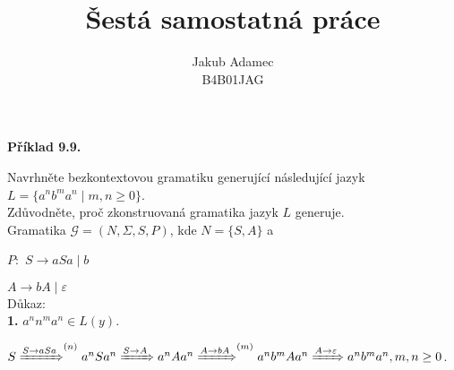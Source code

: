 \documentclass[11pt]{article}
\begin{document}

\newcommand\splitpage[2]{
      \begin{minipage}[t]{0.45\textwidth}#1
      \end{minipage}%
      \hfill
      \begin{minipage}[t]{0.45\textwidth}#2
      \end{minipage}
}
 
 
\title{\textbf{Šestá samostatná práce}}
\author{Jakub Adamec\\ %
B4B01JAG} %

\maketitle

\noindent
\textbf{Příklad 9.9.} 

Navrhněte bezkontextovou gramatiku generující následující jazyk ${L = \{a^n b^m a^n \mid m, n \geq 0\}}$.\\
Zdůvodněte, proč zkonstruovaná gramatika jazyk $L$ generuje.\\

\noindent
Gramatika $\mathcal{G}=(N, \Sigma, S, P)$, kde $N=\{S, A\}$ a

\noindent
$P: $
$S \rightarrow aSa \mid b$

$A \rightarrow bA \mid \varepsilon$\\


\noindent
Důkaz:
\\

\textbf{1.} $a^n n^m a^n \in L(y)$.

$S \xRightarrow{S \rightarrow a S a }^{(n)} a^n S a^n \xRightarrow{S \rightarrow A} a^n A a^n \xRightarrow{A \rightarrow bA}^{(m)} a^n b^m A a^n \xRightarrow{A \rightarrow \varepsilon} a^n b^m a^n , m,n \geq 0$.\\
\end{document}

